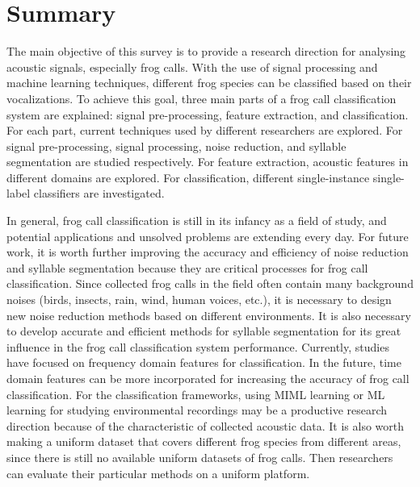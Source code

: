 \section{Summary}
\label{conclusion}
The main objective of this survey is to provide a research direction for analysing acoustic signals, especially frog calls. With the use of signal processing and machine learning techniques, different frog species can be classified based on their vocalizations. To achieve this goal, three main parts of a frog call classification system are explained: signal pre-processing, feature extraction, and classification. For each part, current techniques used by different researchers are explored. For signal pre-processing, signal processing, noise reduction, and syllable segmentation are studied respectively. For feature extraction, acoustic features in different domains are explored. For classification, different single-instance single-label classifiers are investigated. 

In general, frog call classification is still in its infancy as a field of study, and potential applications and unsolved problems are extending every day. For future work, it is worth further improving the accuracy and efficiency of noise reduction and syllable segmentation because they are critical processes for frog call classification. Since collected frog calls in the field often contain many background noises (birds, insects, rain, wind, human voices, etc.), it is necessary to design new noise reduction methods based on different environments. It is also necessary to develop accurate and efficient methods for syllable segmentation for its great influence in the frog call classification system performance. Currently, studies have focused on frequency domain features for classification. In the future, time domain features can be more incorporated for increasing the accuracy of frog call classification. For the classification frameworks, using MIML learning or ML learning for studying environmental recordings may be a productive research direction because of the characteristic of collected acoustic data. It is also worth making a uniform dataset that covers different frog species from different areas, since there is still no available uniform datasets of frog calls. Then researchers can evaluate their particular methods on a uniform platform.




